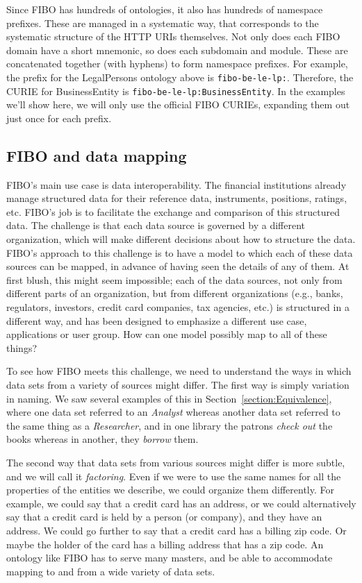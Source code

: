 Since FIBO has hundreds of ontologies, it also has hundreds of namespace prefixes.  These are managed in a systematic way,
that corresponds to the systematic structure of the HTTP URIs themselves.  Not only does each FIBO domain have a short mnemonic, so 
does each subdomain and module.  These are concatenated together (with hyphens) to form namespace prefixes.  For example, the 
prefix for the LegalPersons ontology above is \texttt{fibo-be-le-lp:}.  Therefore, the CURIE for BusinessEntity 
is \texttt{fibo-be-le-lp:BusinessEntity}.  In the examples we'll show here, we will only use the official FIBO CURIEs, expanding
them out just once for each prefix. 

\subsection{FIBO and data mapping}

FIBO's main use case is data interoperability.  The financial institutions already manage structured data for their reference
data, instruments, positions, ratings, etc.  FIBO's job is to facilitate the exchange and comparison of this structured data. 
The challenge is that each data source is governed by a different organization, 
which will make different decisions about how to 
structure the data.  FIBO's approach to this challenge is to have a model 
to which each of these data sources can be mapped,  in advance of having seen the details 
of any of them.   At first blush, this might seem impossible; each of the 
data sources, not only from different parts of an organization, but 
from different organizations (e.g., banks, regulators, investors, credit card companies, 
tax agencies, etc.) is structured in a different way, 
and 
has been designed to emphasize a different use case, applications or
user group. 
How can one model 
possibly map to all of these things?

To see how FIBO meets this challenge, we need to understand the ways in 
which data sets from a variety of sources might differ.  
The first way is simply variation in naming.    
We saw several examples of this in Section~\ref{section:Equivalence}, where one
data set referred to an \emph{Analyst} whereas another 
data set referred to the same thing as a \emph{Researcher}, and in one 
library 
the patrons \emph{check out} the books whereas in another, 
they \emph{borrow} them.  

The second way that data sets from various sources might differ 
is more subtle, and we will call it \emph{factoring}.  
Even if we were to use the same names for all
the properties of the entities we describe, we could organize 
them differently.  For example, we could say that a credit card has
an address, or we could alternatively say that a credit card is 
held by a person (or company), and they have an address.  We could go further 
to say that a credit card has a billing zip code.  Or maybe the holder of 
the card has a billing address that has a zip code. 
An ontology like FIBO has to serve many masters, 
and be able to accommodate mapping to and from a wide variety of data sets. 

